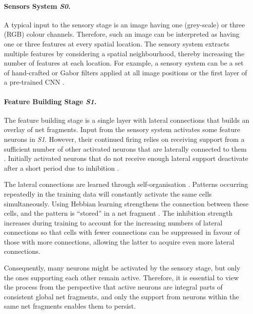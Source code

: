 \paragraph{Sensors System \emph{S0}.} A typical input to the sensory stage is an image having one (grey-scale) or three (RGB) colour channels. Therefore, such an image can be interpreted as having one or three features at every spatial location.
The sensory system extracts multiple features by considering a spatial neighbourhood, thereby increasing the number of features at each location.
For example, a sensory system can be a set of hand-crafted or Gabor filters  applied at all image positions or the first layer of a pre-trained CNN .

\paragraph{Feature Building Stage \emph{S1}.} The feature building stage is a single layer with lateral connections  that builds an overlay of net fragments. Input from the sensory system activates some feature neurons in \emph{S1}. However, their continued firing relies on receiving support from a sufficient number of other activated neurons that are laterally connected to them . Initially activated neurons that do not receive enough lateral support deactivate after a short period due to inhibition .

The lateral connections are learned through self-organisation \cite{hebb_organization_1949}. Patterns occurring repeatedly in the training data will constantly activate the same cells simultaneously. Using Hebbian learning \cite{hebb_organization_1949} strengthens the connection between these cells, and the pattern is ``stored'' in a net fragment \cite{von_der_malsburg_concerning_2018}. The inhibition strength increases during training to account for the increasing numbers of lateral connections so that cells with fewer connections can be suppressed in favour of those with more connections, allowing the latter to acquire even more lateral connections.

Consequently, many neurons might be activated by the sensory stage, but only the ones supporting each other remain active.
Therefore, it is essential to view the process from the perspective that active neurons are integral parts of consistent global net fragments, and only the support from neurons within the same net fragments enables them to persist.

